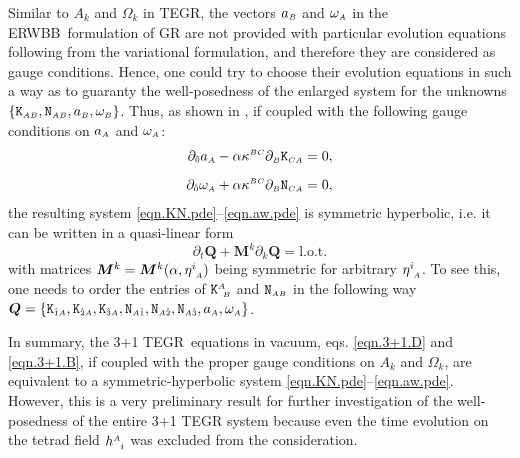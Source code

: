 \documentclass[
10pt, %
a4paper, %
oneside, %
twocolumn,
headinclude,footinclude, %
BCOR5mm, %
]{scrartcl}
\newcommand{\ERWBB}{{ERWBB}}
\newcommand{\sA}{\mathsmaller A}
\newcommand{\sB}{\mathsmaller B}
\newcommand{\sC}{\mathsmaller C}
\newcommand{\pd}[1]{\partial_{#1}}
\newcommand{\MG}[1]{\kappa^{#1}}			%
\newcommand{\tetrsymbol}{h}
\newcommand{\itetrsymbol}{\eta}
\newcommand{\itetr}[2]{\itetrsymbol^{#1}_{\phantom{#1}#2}}
\newcommand{\tetr}[2]{\tetrsymbol^{#1}_{\phantom{#1}#2}}
\newcommand{\Kbuch}[2]{\mathtt{K}_{{#1}{#2}}}	%
\newcommand{\Nbuchdown}[2]{\mathtt{N}_{#1#2}}	%
\newcommand{\Kbuchmix}[2]{\mathtt{K}^{#1}_{\ #2}}	%
\newcommand{\tegr}{TEGR}
\newcommand{\indalg}[1]{\hat{\mathsmaller{#1}}}
\begin{document}
	Similar to $ A_k $ and $ \Omega_k $ in TEGR, the vectors $ a_{\sB} $ and $
	\omega_{\sA} $ in the \ERWBB\ formulation of GR are not provided with
	particular evolution equations following from the variational formulation,
	and therefore they are considered as gauge conditions. Hence, one could try
	to choose their evolution equations in such a way as to guaranty the
	well-posedness of the enlarged system for the unknowns $
	\{\Kbuch{\sA}{\sB},\Nbuchdown{\sA}{\sB},a_\sB,\omega_\sB \}$. Thus, as shown
	in \cite{Estabrook1997,Buchman2003}, if coupled with the following gauge
	conditions on $a_\sA$ and $\omega_\sA$:
	\begin{subequations}\label{eqn.aw.pde}
		\begin{align}
			\pd{\indalg{0}} a_\sA - \alpha \MG{\sB\sC}\pd{\sB} \Kbuch{\sC}{\sA} &= 0,
			\\[2mm]
			\pd{\indalg{0}} \omega_\sA + \alpha \MG{\sB\sC}\pd{\sB} \Nbuchdown{\sC}{\sA} &= 0,
		\end{align}
	\end{subequations}
	the resulting system \eqref{eqn.KN.pde}--\eqref{eqn.aw.pde} is symmetric
	hyperbolic, i.e. it can be written in a quasi-linear form
	\begin{equation}\label{eqn.quasi.lin}
		\pd{t} \bm{Q} + \bm{M}^k\pd{k} \bm{Q} = \text{l.o.t.}
	\end{equation}
	with matrices $ \bm{M}^k = \bm{M}^k(\alpha,\itetr{i}{\sA})$ being symmetric for arbitrary $\itetr{i}{\sA}$.
	To see this, one needs to order the entries of
	$\Kbuchmix{\sA}{\sB}$ and $\Nbuchdown{\sA}{\sB}$ in the following way
	$\bm{Q} = \{\Kbuch{\indalg{1}}{\sA},\Kbuch{\indalg{2}}{\sA},\Kbuch{\indalg{3}}{\sA},\Nbuchdown{\sA}{\indalg{1}},\Nbuchdown{\sA}{\indalg{2}},\Nbuchdown{\sA}{\indalg{3}},a_\sA,\omega_\sA\}$.
	
	In summary, the 3+1 \tegr\ equations in vacuum, eqs. \eqref{eqn.3+1.D} and
	\eqref{eqn.3+1.B}, if coupled with the proper gauge conditions on $A_k$ and
	$\Omega_k$, are equivalent to a symmetric-hyperbolic system
	\eqref{eqn.KN.pde}--\eqref{eqn.aw.pde}. However, this is a very preliminary
	result for further investigation of the well-posedness of the entire 3+1 TEGR
	system because even the time evolution on the tetrad field $\tetr{\sA}{i}$
	was excluded from the consideration.

	
\end{document}
